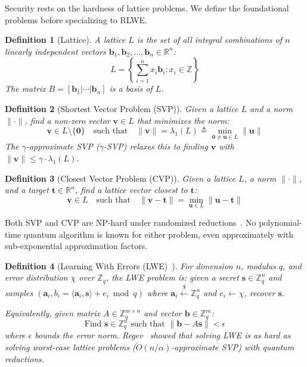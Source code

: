 \documentclass[11pt,a4paper]{article}
\newtheorem{definition}{Definition}[section]
\begin{document}
Security rests on the hardness of lattice problems. We define the
foundational problems before specializing to RLWE.

\begin{definition}[Lattice]
A lattice $L$ is the set of all integral combinations of $n$ linearly
independent vectors $\mathbf{b}_1, \mathbf{b}_2, \ldots, \mathbf{b}_n
\in \mathbb{R}^n$:
\[
L = \left\{ \sum_{i=1}^{n} x_i \mathbf{b}_i : x_i \in \mathbb{Z}
\right\}
\]
The matrix $B = [\mathbf{b}_1 | \cdots | \mathbf{b}_n]$ is a basis
of $L$.
\end{definition}

\begin{definition}[Shortest Vector Problem (SVP)]
Given a lattice $L$ and a norm $\|\cdot\|$, find a non-zero vector
$\mathbf{v} \in L$ that minimizes the norm:
\[
\mathbf{v} \in L \setminus \{\mathbf{0}\} \quad\text{such that}\quad
\|\mathbf{v}\| = \lambda_1(L) \triangleq
\min_{\mathbf{0} \neq \mathbf{u} \in L} \|\mathbf{u}\|
\]
The $\gamma$-approximate SVP ($\gamma$-SVP) relaxes this to finding
$\mathbf{v}$ with $\|\mathbf{v}\| \leq \gamma \cdot \lambda_1(L)$.
\end{definition}

\begin{definition}[Closest Vector Problem (CVP)]
Given a lattice $L$, a norm $\|\cdot\|$, and a target
$\mathbf{t} \in \mathbb{R}^n$, find a lattice vector closest
to $\mathbf{t}$:
\[
\mathbf{v} \in L \quad\text{such that}\quad
\|\mathbf{v} - \mathbf{t}\| =
\min_{\mathbf{u} \in L} \|\mathbf{u} - \mathbf{t}\|
\]
\end{definition}

Both SVP and CVP are NP-hard under randomized
reductions~\cite{ajtai1996}. No polynomial-time quantum algorithm is
known for either problem, even approximately with sub-exponential
approximation factors.

\begin{definition}[Learning With Errors (LWE)~\cite{regev2005}]
For dimension $n$, modulus $q$, and error distribution $\chi$ over
$\mathbb{Z}_q$, the LWE problem is: given a secret
$\mathbf{s} \in \mathbb{Z}_q^n$ and samples
$(\mathbf{a}_i, b_i = \langle \mathbf{a}_i, \mathbf{s} \rangle
+ e_i \bmod q)$ where $\mathbf{a}_i \xleftarrow{\$} \mathbb{Z}_q^n$
and $e_i \leftarrow \chi$, recover $\mathbf{s}$.

Equivalently, given matrix $A \in \mathbb{Z}_q^{m \times n}$ and
vector $\mathbf{b} \in \mathbb{Z}_q^m$:
\[
\text{Find } \mathbf{s} \in \mathbb{Z}_q^n
\text{ such that }
\|\mathbf{b} - A\mathbf{s}\| < \epsilon
\]
where $\epsilon$ bounds the error norm. Regev~\cite{regev2005} showed
that solving LWE is as hard as solving worst-case lattice problems
($\widetilde{O}(n/\alpha)$-approximate SVP) with quantum reductions.
\end{definition}
\end{document}
